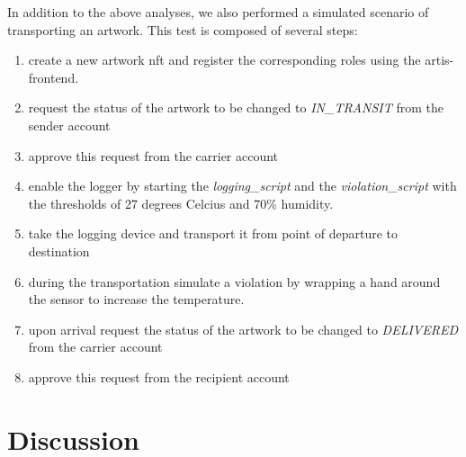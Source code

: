 In addition to the above analyses, we also performed a simulated scenario of transporting an artwork. This test is composed of several steps:

\begin{enumerate}
    \item create a new artwork \gls{nft} and register the corresponding roles using the artis-frontend.
    \item request the status of the artwork to be changed to \textit{IN\_TRANSIT} from the sender account
    \item approve this request from the carrier account
    \item enable the logger by starting the \textit{logging\_script} and the \textit{violation\_script} with the thresholds of 27 degrees Celcius and 70\% humidity.
    \item take the logging device and transport it from point of departure to destination
    \item during the transportation simulate a violation by wrapping a hand around the sensor to increase the temperature.
    \item upon arrival request the status of the artwork to be changed to \textit{DELIVERED} from the carrier account
    \item approve this request from the recipient account
\end{enumerate}

\section{Discussion}
\label{sec:eval_discussion}